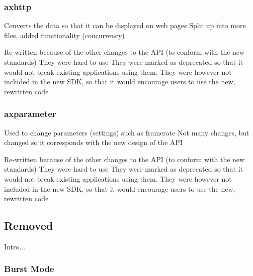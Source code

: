 \documentclass[conference]{IEEEtran}
\begin{document}






\subsubsection{axhttp}

Converts the data so that it can be displayed on web pages
Split up into more files, added functionality (concurrency)




Re-written because of the other changes to the API (to conform with the new standards)
They were hard to use
They were marked as deprecated so that it would not break existing applications using them. 
They were however not included in the new SDK, so that it would encourage users to use the new, rewritten code










\subsubsection{axparameter}

Used to change parameters (settings) such as framerate
Not many changes, but changed so it corresponds with the new design of the API




Re-written because of the other changes to the API (to conform with the new standards)
They were hard to use
They were marked as deprecated so that it would not break existing applications using them. 
They were however not included in the new SDK, so that it would encourage users to use the new, rewritten code










\subsection{Removed}
Intro...

\subsubsection{Burst Mode}
\end{document}
